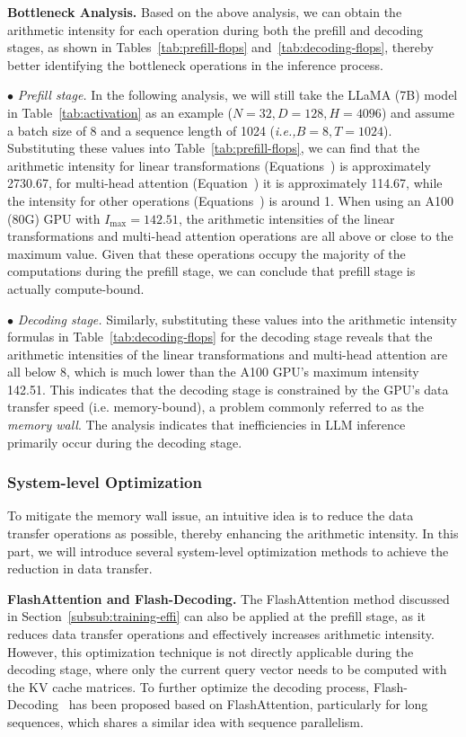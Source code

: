 \textbf{Bottleneck Analysis.} Based on the above analysis, we can obtain the arithmetic intensity for each operation during both the prefill and decoding stages, as shown in Tables~\ref{tab:prefill-flops} and~\ref{tab:decoding-flops}, thereby better identifying the bottleneck operations in the inference process.

$\bullet$ \emph{Prefill stage.} In the following analysis, we will still take the LLaMA (7B) model in Table~\ref{tab:activation} as an example ($N=32, D=128, H=4096$) and assume a batch size of 8 and a sequence length of 1024 (\emph{i.e.,}$B=8, T=1024$). Substituting these values into Table~\ref{tab:prefill-flops}, we can find that the arithmetic intensity for linear transformations (Equations~) is approximately 2730.67, for multi-head attention (Equation~) it is approximately 114.67, while the intensity for other operations (Equations~) is around 1. When using an A100 (80G) GPU with $I_{\text{max}}=142.51$, the arithmetic intensities of the linear transformations and multi-head attention operations are all above or close to the maximum value. Given that these operations occupy the majority of the computations during the prefill stage, we can conclude that prefill stage is actually compute-bound.

$\bullet$ \emph{Decoding stage.} Similarly, substituting these values into the arithmetic intensity formulas in Table~\ref{tab:decoding-flops} for the decoding stage reveals that the arithmetic intensities of the linear transformations and multi-head attention are all below 8, which is much lower than the A100 GPU's maximum intensity 142.51. This indicates that the decoding stage is constrained by the GPU's data transfer speed (i.e. memory-bound), a problem commonly referred to as the \emph{memory wall}. The analysis indicates that inefficiencies in LLM inference primarily occur during the decoding stage.

\subsubsection{System-level Optimization} To mitigate the memory wall issue, an intuitive idea is to reduce the data transfer operations as possible, thereby enhancing the arithmetic intensity. In this part, we will introduce several system-level optimization methods to achieve the reduction in data transfer.

\textbf{FlashAttention and Flash-Decoding.} The FlashAttention method discussed in Section~\ref{subsub:training-effi} can also be applied at the prefill stage, as it reduces data transfer operations and effectively increases arithmetic intensity. However, this optimization technique is not directly applicable during the decoding stage, where only the {current query vector needs to be computed with the KV cache matrices}. To further optimize the decoding process,  Flash-Decoding~\cite{dao-web-2023-flash} has been proposed based on FlashAttention, particularly for long sequences, which shares a similar idea with sequence parallelism.   

